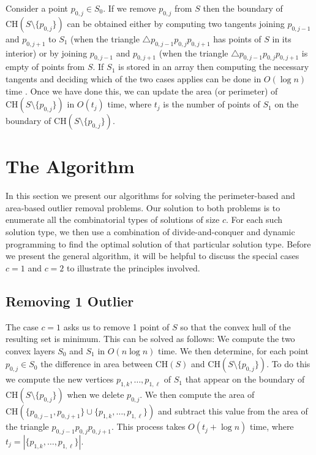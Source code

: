 \documentclass[lotsofwhite]{patmorin}
\newcommand{\ch}{\mathrm{CH}}
\begin{document}
Consider a point $p_{0,j}\in S_0$.  If we remove $p_{0,j}$ from $S$
then the boundary of $\ch(S\setminus\{p_{0,j}\})$ can be obtained
either by computing two tangents joining $p_{0,j-1}$ and $p_{0,j+1}$
to $S_1$ (when the triangle $\triangle p_{0,j-1}p_{0,j}p_{0,j+1}$ has
points of $S$ in its interior) or by joining $p_{0,j-1}$ and
$p_{0,j+1}$ (when the triangle $\triangle p_{0,j-1}p_{0,j}p_{0,j+1}$
is empty of points from $S$.  If $S_1$ is stored in an array then
computing the necessary tangents and deciding which of the two cases
applies can be done in $O(\log n)$ time \cite{X}.  Once we have done
this, we can update the area (or perimeter) of
$\ch(S\setminus\{p_{0,j}\})$ in $O(t_j)$ time, where $t_j$ is the
number of points of $S_1$ on the boundary of
$\ch(S\setminus\{p_{0,j}\})$. 

\section{The Algorithm}

In this section we present our algorithms for solving the
perimeter-based and area-based outlier removal problems. Our solution
to both problems is to enumerate all the combinatorial types of
solutions of size $c$.  For each such solution type, we then use a
combination of divide-and-conquer and dynamic programming to find the
optimal solution of that particular solution type.  Before we present
the general algorithm, it will be helpful to discuss the special cases
$c=1$ and $c=2$ to illustrate the principles involved.

\subsection{Removing 1 Outlier}

The case $c=1$ asks us to remove 1 point of $S$ so that the convex
hull of the resulting set is minimum.  This can be solved as follows:
We compute the two convex layers $S_0$ and $S_1$ in $O(n\log n)$ time.
We then determine, for each point $p_{0,j}\in S_0$ the difference in
area between $\ch(S)$ and $\ch(S\setminus\{p_{0,j}\})$.  To do this we
compute the new vertices $p_{1,k},\ldots,p_{1,\ell}$ of $S_1$ that
appear on the boundary of $\ch(S\setminus\{p_{0,j}\})$ when we delete
$p_{0,j}$.  We then compute the area of
$\ch(\{p_{0,j-1},p_{0,j+1}\}\cup\{p_{1,k},\ldots,p_{1,\ell}\})$ and
subtract this value from the area of the triangle
$p_{0,j-1}p_{0,j}p_{0,j+1}$.   This process takes $O(t_j+\log n)$
time, where $t_j=|\{p_{1,k},\ldots,p_{1,\ell}\}|$.
\end{document}
